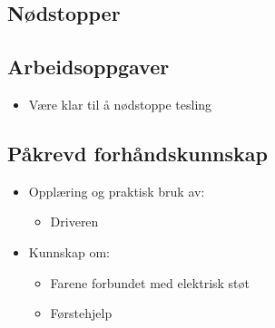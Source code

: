 \subsection{Nødstopper}

\subsection*{Arbeidsoppgaver}
\begin{itemize}
\item{Være klar til å nødstoppe tesling}
\end{itemize}


\subsection*{Påkrevd forhåndskunnskap}
\begin{itemize}
\item{Opplæring og praktisk bruk av:}
\begin{itemize}
\iftoggle{INTERN}{
    \item{Hansken}
}{
}
\item{Driveren}
\end{itemize}
\item{Kunnskap om:}
\begin{itemize}
\item{Farene forbundet med elektrisk støt}
\item{Førstehjelp}
\end{itemize}
\end{itemize}